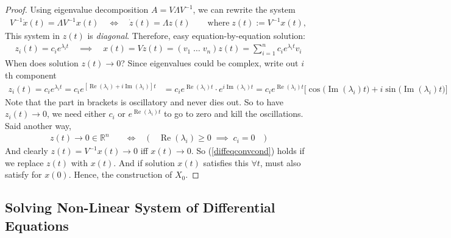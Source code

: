 \documentclass[12pt]{book}
\numberwithin{equation}{section} %
\theoremstyle{plain}
\theoremstyle{definition}
\theoremstyle{remark}
\newcommand{\ra}{\rightarrow}
\newcommand{\dx}{\dot{x}}
\newcommand{\dz}{\dot{z}}
\newcommand{\Rn}{\mathbb{R}^n}
\renewcommand{\Re}{\operatorname{Re}}
\renewcommand{\Im}{\operatorname{Im}}
\newcommand{\sumin}{\sum^n_{i=1}}
\begin{document}
\begin{proof}
Using eigenvalue decomposition $A=V\Lambda V^{-1}$, we can rewrite the
system
\begin{align*}
  V^{-1}\dx(t) = \Lambda V^{-1}x(t)
  \quad\iff\quad
  \dz(t) = \Lambda z(t)
  \qquad \text{where} \; z(t) := V^{-1}x(t),
\end{align*}
This system in $z(t)$ is \emph{diagonal}. Therefore, easy
equation-by-equation solution:
\begin{align*}
  z_i(t) =
  c_i e^{\lambda_i t}
  \quad\implies\quad
  x(t) = V z(t)
  = (v_1\;\ldots\;v_n) z(t)
  = \sumin c_i e^{\lambda_i t}v_i
\end{align*}
When does solution $z(t)\ra 0$?
Since eigenvalues could be complex, write out $i$th component
\begin{align*}
  z_i(t)
  =
  c_i e^{\lambda_it}
  =
  c_i e^{[\Re(\lambda_i) + i\Im(\lambda_i)]t}
  &=
  c_i e^{\Re(\lambda_i)t} \cdot e^{i\Im(\lambda_i)t}
  =
  c_i e^{\Re(\lambda_i)t}
  \big[
  \cos\big(\Im(\lambda_i) t\big) + i \sin\big(\Im(\lambda_i) t\big)
  \big]
\end{align*}
Note that the part in brackets is oscillatory and never dies out.
So to have $z_i(t)\ra 0$, we need either $c_i$ or $e^{\Re(\lambda_i)t}$
to go to zero and kill the oscillations. Said another way,
\begin{align}
  z(t)
  \ra 0\in\Rn
  \quad&\iff\quad
  \big(\quad
  \Re(\lambda_i) \geq 0
  \;\implies\; c_i=0
  \quad\big)
  \label{diffeqconvcond}
\end{align}
And clearly $z(t)=V^{-1}x(t)\ra 0$ iff $x(t)\ra 0$.
So (\ref{diffeqconvcond}) holds if we replace $z(t)$ with $x(t)$.
And if solution $x(t)$ satisfies this $\forall t$, must also satisfy for
$x(0)$.
Hence, the construction of $X_0$.
\end{proof}


\subsection{Solving Non-Linear System of Differential Equations}
\end{document}
